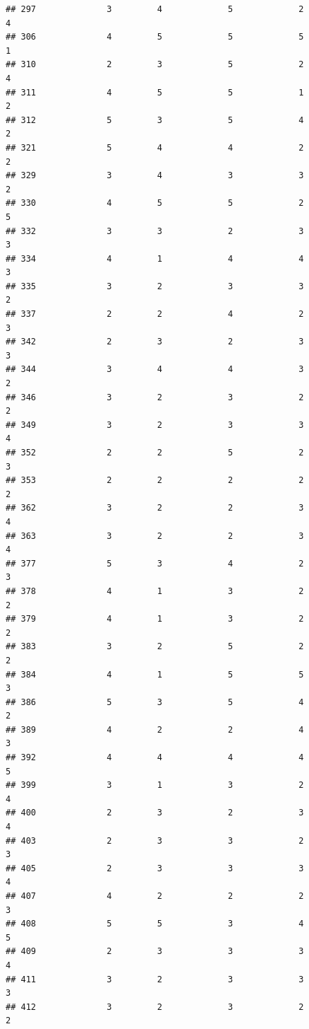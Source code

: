 \documentclass[
]{article}
\begin{document}
\begin{verbatim}
## 297              3         4             5             2           4
## 306              4         5             5             5           1
## 310              2         3             5             2           4
## 311              4         5             5             1           2
## 312              5         3             5             4           2
## 321              5         4             4             2           2
## 329              3         4             3             3           2
## 330              4         5             5             2           5
## 332              3         3             2             3           3
## 334              4         1             4             4           3
## 335              3         2             3             3           2
## 337              2         2             4             2           3
## 342              2         3             2             3           3
## 344              3         4             4             3           2
## 346              3         2             3             2           2
## 349              3         2             3             3           4
## 352              2         2             5             2           3
## 353              2         2             2             2           2
## 362              3         2             2             3           4
## 363              3         2             2             3           4
## 377              5         3             4             2           3
## 378              4         1             3             2           2
## 379              4         1             3             2           2
## 383              3         2             5             2           2
## 384              4         1             5             5           3
## 386              5         3             5             4           2
## 389              4         2             2             4           3
## 392              4         4             4             4           5
## 399              3         1             3             2           4
## 400              2         3             2             3           4
## 403              2         3             3             2           3
## 405              2         3             3             3           4
## 407              4         2             2             2           3
## 408              5         5             3             4           5
## 409              2         3             3             3           4
## 411              3         2             3             3           3
## 412              3         2             3             2           2

\end{verbatim}
\end{document}
